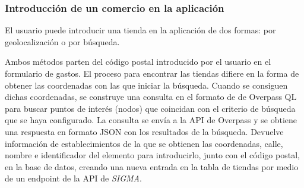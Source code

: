 \subsubsection{Introducción de un comercio en la aplicación}
El usuario puede introducir una tienda en la aplicación de dos formas: por geolocalización o por búsqueda.

Ambos métodos parten del código postal introducido por el usuario en el formulario de gastos. El proceso para encontrar las tiendas difiere en la forma de obtener las coordenadas con las que iniciar la búsqueda. Cuando se consiguen dichas coordenadas, se construye una consulta en el formato de de Overpass QL para buscar puntos de interés (nodos) que coincidan con el criterio de búsqueda que se haya configurado. La consulta se envía a la API de Overpass y se obtiene una respuesta en formato JSON con los resultados de la búsqueda. Devuelve información de establecimientos de la que se obtienen las coordenadas, calle, nombre e identificador del elemento para introducirlo, junto con el código postal, en la base de datos, creando una nueva entrada en la tabla de tiendas por medio de un endpoint de la API de \textit{SIGMA}.

